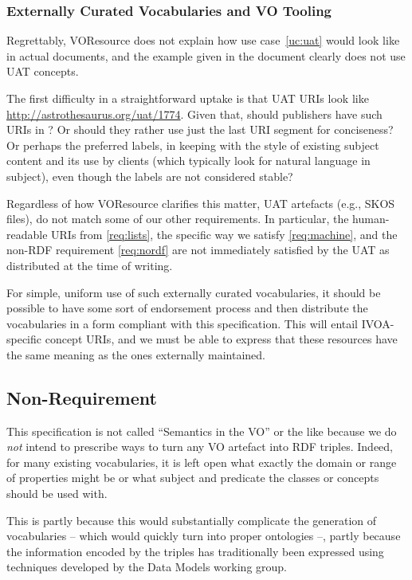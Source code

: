 \documentclass[11pt,a4paper]{ivoa}
\begin{document}
\subsubsection{Externally Curated Vocabularies and VO Tooling}
\label{req:external}

Regrettably, VOResource does not explain how use case~\ref{uc:uat} would
look like in actual documents, and the example given in the document
clearly does not use UAT concepts. 

The first difficulty in a straightforward uptake is that UAT URIs look
like \url{http://astrothesaurus.org/uat/1774}. Given that, should
publishers have such URIs in ?  Or should they rather use
just the last URI segment for conciseness?  Or perhaps the preferred
labels, in keeping with the style of existing subject content and its
use by clients (which typically look for natural language in subject),
even though the labels are not considered stable?

Regardless of how VOResource clarifies this matter, UAT artefacts (e.g.,
SKOS files), do not match some of our other requirements. In particular,
the human-readable URIs from \ref{req:lists}, the specific way we
satisfy \ref{req:machine}, and the non-RDF requirement \ref{req:nordf} are
not immediately satisfied by the UAT as distributed at the time of
writing.

For simple, uniform use of such externally curated vocabularies, it
should be possible to have some sort of endorsement process and then
distribute the vocabularies in a form compliant with this specification.
This will entail IVOA-specific concept URIs, and we must be able to
express that these resources have the same meaning as the ones
externally maintained.


\subsection{Non-Requirement}

This specification is not called ``Semantics in the VO'' or the like
because we do \emph{not} intend to prescribe ways to turn any VO
artefact into RDF triples.  Indeed, for many existing vocabularies, it
is left open what exactly the domain or range of properties might be or
what subject and predicate the classes or concepts should be used with.

This is partly because this would substantially complicate the
generation of vocabularies -- which would quickly turn into proper
ontologies --, partly because the information encoded by
the triples has traditionally been expressed using techniques developed
by the Data Models working group.
\end{document}
